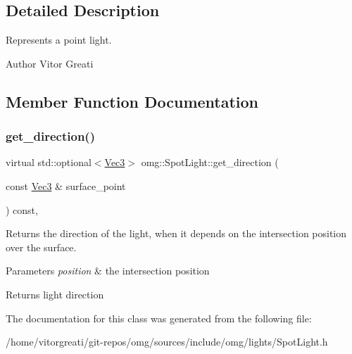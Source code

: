 \subsection{Detailed Description}
Represents a point light. 

\begin{DoxyAuthor}{Author}
Vitor Greati 
\end{DoxyAuthor}


\subsection{Member Function Documentation}
\mbox{\label{classomg_1_1_spot_light_a8a82a670fff00ac2d72cd2cd4baec335}} 
\subsubsection{\texorpdfstring{get\_direction()}{get\_direction()}}
{\footnotesize\ttfamily virtual std\+::optional$<$\mbox{\hyperlink{namespaceomg_a45a9482677fee9933ff369b49894e316}{Vec3}}$>$ omg\+::\+Spot\+Light\+::get\+\_\+direction (\begin{DoxyParamCaption}\item[{const \mbox{\hyperlink{namespaceomg_a45a9482677fee9933ff369b49894e316}{Vec3}} \&}]{surface\+\_\+point }\end{DoxyParamCaption}) const\hspace{0.3cm}{\ttfamily [inline]}, {\ttfamily [virtual]}}



Returns the direction of the light, when it depends on the intersection position over the surface. 


\begin{DoxyParams}{Parameters}
{\em position} & the intersection position \\
\hline
\end{DoxyParams}
\begin{DoxyReturn}{Returns}
light direction 
\end{DoxyReturn}


The documentation for this class was generated from the following file\+:\begin{DoxyCompactItemize}
\item 
/home/vitorgreati/git-\/repos/omg/sources/include/omg/lights/Spot\+Light.\+h\end{DoxyCompactItemize}

